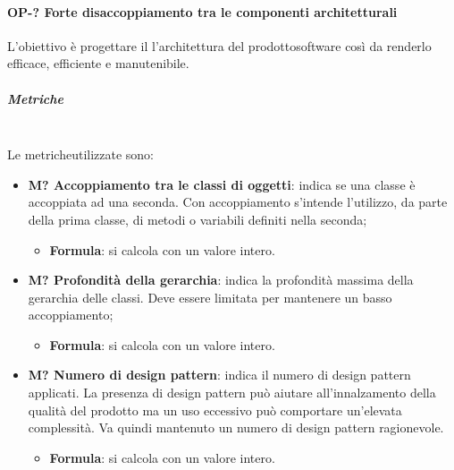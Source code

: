 		\paragraph{OP-? Forte disaccoppiamento tra le componenti architetturali}
		L'obiettivo è progettare il l'architettura del prodotto\glosp software così da renderlo efficace, efficiente e manutenibile.
		\subparagraph{Metriche}\mbox{}\\ [1mm]
		Le metriche\glosp utilizzate sono:
		\begin{itemize}
			\item \textbf{M? Accoppiamento tra le classi di oggetti}: indica se una classe è accoppiata ad una seconda. Con accoppiamento s'intende l'utilizzo, da parte della prima classe, di metodi o variabili definiti nella seconda; 
			\begin{itemize}
				\item[] \textbf{Formula}: si calcola con un valore intero.
			\end{itemize}
			\item \textbf{M? Profondità della gerarchia}: indica la profondità massima della gerarchia delle classi. Deve essere limitata per mantenere un basso accoppiamento;
			\begin{itemize}
				\item[] \textbf{Formula}: si calcola con un valore intero.
			\end{itemize} 	
			\item \textbf{M? Numero di design pattern}: indica il numero di design pattern applicati. La presenza di design pattern può aiutare all'innalzamento della qualità del prodotto ma un uso eccessivo può comportare un'elevata complessità. Va quindi mantenuto un numero di design pattern ragionevole.
			\begin{itemize}
				\item[] \textbf{Formula}: si calcola con un valore intero.
			\end{itemize} 	
		\end{itemize}
		
